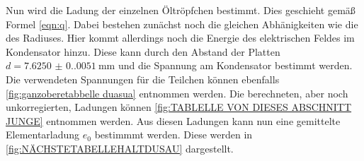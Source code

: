 Nun wird die Ladung der einzelnen Öltröpfchen bestimmt. Dies geschieht gemäß Formel \eqref{eqn:q}. Dabei bestehen zunächst noch die gleichen Abhänigkeiten wie die des Radiuses.
Hier kommt allerdings noch die Energie des elektrischen Feldes im Kondensator hinzu. Diese kann durch den Abstand der Platten $d = \qty{7.6250(0.0051)}{\milli\metre}$ und die 
Spannung am Kondensator bestimmt werden. Die verwendeten Spannungen für die Teilchen können ebenfalls \autoref{fig:ganzoberetabbelle duasua} entnommen werden. Die berechneten,
aber noch unkorregierten, Ladungen können \autoref{fig:TABLELLE VON DIESES ABSCHNITT JUNGE} entnommen werden. Aus diesen Ladungen kann nun eine gemittelte Elementarladung $e_0$
bestimmmt werden. Diese werden in \autoref{fig:NÄCHSTETABELLEHALTDUSAU} dargestellt.